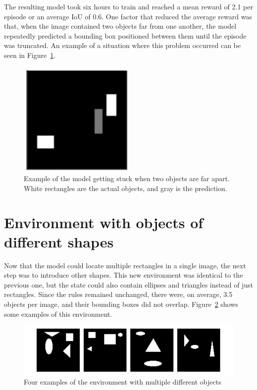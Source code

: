 \documentclass[
  digital,     %
  oneside,     %
  nosansbold,  %
  nocolorbold, %
  lof,         %
  lot,         %
]{fithesis4}
\begin{document}
The resulting model took six hours to train and reached a mean reward of 2.1 per episode or an average IoU of 0.6. One factor that reduced the average reward was that, when the image contained two objects far from one another, the model repeatedly predicted a bounding box positioned between them until the episode was truncated. An example of a situation where this problem occurred can be seen in Figure~\ref{fig:v3_stuck}.

\begin{figure}
    \centering
    \includegraphics[width=0.25\linewidth]{results/v3_stuck.png}
    \caption{Example of the model getting stuck when two objects are far apart. White rectangles are the actual objects, and gray is the prediction.}
    \label{fig:v3_stuck}
\end{figure}

\section{Environment with objects of different shapes}
\label{sec:different_shapes}
Now that the model could locate multiple rectangles in a single image, the next step was to introduce other shapes. This new environment was identical to the previous one, but the state could also contain ellipses and triangles instead of just rectangles. Since the rules remained unchanged, there were, on average, 3.5 objects per image, and their bounding boxes did not overlap. Figure~\ref{fig:env4} shows some examples of this environment.

\begin{figure}[h]
    \includegraphics[width=1\linewidth]{env_examples/env4.pdf}
    \caption{Four examples of the environment with multiple different objects}
    \label{fig:env4}
\end{figure}
 
\end{document}
